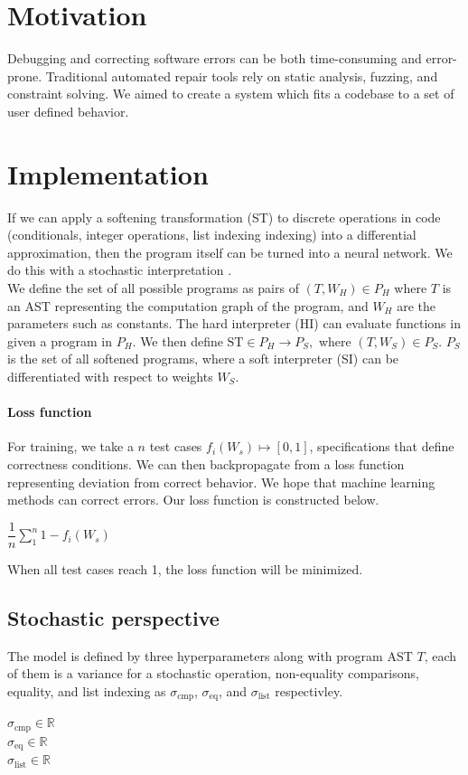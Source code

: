 \documentclass{article}
\begin{document}
\section{Motivation}
Debugging and correcting software errors can be both time-consuming and error-prone. Traditional automated repair tools rely on static analysis, fuzzing, and constraint solving. We aimed to create a system which fits a codebase to a set of user defined behavior.
\section{Implementation}
If we can apply a softening transformation (ST) to discrete operations in code (conditionals, integer operations, list indexing indexing) into a differential approximation, then the program itself can be turned into a neural network. We do this with a stochastic interpretation \cite{blondel2024elementsdifferentiableprogramming}.\\
We define the set of all possible programs as pairs of $(T, W_H) \in P_H$ where $T$ is an AST representing the computation graph of the program, and $W_H$ are the parameters such as constants. The hard interpreter (HI) can evaluate functions in given a program in $P_H$. We then define $\text{ST} \in P_H \longrightarrow P_S,$ where $(T, W_S) \in P_S$. $P_S$ is the set of all softened programs, where a soft interpreter (SI) can be differentiated with respect to weights $W_S$.\\
\paragraph{Loss function} For training, we take a $n$ test cases $f_i(W_s) \mapsto [0, 1]$,  specifications that define correctness conditions. We can then backpropagate from a loss function representing deviation from correct behavior. We hope that machine learning methods can correct errors. Our loss function is constructed below.
\begin{center}
  $\dfrac{1}{n} \sum_1^n 1 - f_i(W_s)$
\end{center}
When all test cases reach 1, the loss function will be minimized.
\subsection{Stochastic perspective}
The model is defined by three hyperparameters along with program AST $T$, each of them is a variance for a stochastic operation, non-equality comparisons, equality, and list indexing as $\sigma_{\text{cmp}}$, $\sigma_{\text{eq}}$, and $\sigma_{\text{list}}$ respectivley.
\begin{center}
  $\sigma_{\text{cmp}} \in \mathbb{R}$\\
  $\sigma_{\text{eq}} \in \mathbb{R}$\\
  $\sigma_{\text{list}} \in \mathbb{R}$
\end{center}
\end{document}
